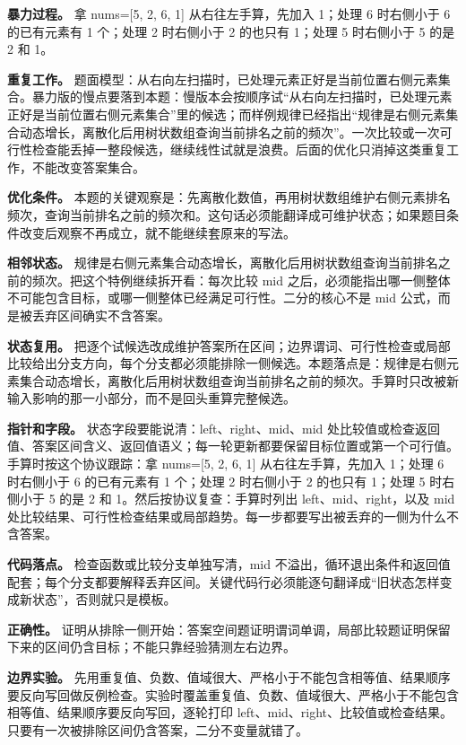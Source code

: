 \textbf{暴力过程。} 拿 nums=[5, 2, 6, 1] 从右往左手算，先加入 1；处理 6 时右侧小于 6 的已有元素有 1 个；处理 2 时右侧小于 2 的也只有 1；处理 5 时右侧小于 5 的是 2 和 1。

\textbf{重复工作。} 题面模型：从右向左扫描时，已处理元素正好是当前位置右侧元素集合。暴力版的慢点要落到本题：慢版本会按顺序试“从右向左扫描时，已处理元素正好是当前位置右侧元素集合”里的候选；而样例规律已经指出“规律是右侧元素集合动态增长，离散化后用树状数组查询当前排名之前的频次”。一次比较或一次可行性检查能丢掉一整段候选，继续线性试就是浪费。后面的优化只消掉这类重复工作，不能改变答案集合。

\textbf{优化条件。} 本题的关键观察是：先离散化数值，再用树状数组维护右侧元素排名频次，查询当前排名之前的频次和。这句话必须能翻译成可维护状态；如果题目条件改变后观察不再成立，就不能继续套原来的写法。

\textbf{相邻状态。} 规律是右侧元素集合动态增长，离散化后用树状数组查询当前排名之前的频次。把这个特例继续拆开看：每次比较 mid 之后，必须能指出哪一侧整体不可能包含目标，或哪一侧整体已经满足可行性。二分的核心不是 mid 公式，而是被丢弃区间确实不含答案。

\textbf{状态复用。} 把逐个试候选改成维护答案所在区间；边界谓词、可行性检查或局部比较给出分支方向，每个分支都必须能排除一侧候选。本题落点是：规律是右侧元素集合动态增长，离散化后用树状数组查询当前排名之前的频次。手算时只改被新输入影响的那一小部分，而不是回头重算完整候选。

\textbf{指针和字段。} 状态字段要能说清：left、right、mid、mid 处比较值或检查返回值、答案区间含义、返回值语义；每一轮更新都要保留目标位置或第一个可行值。手算时按这个协议跟踪：拿 nums=[5, 2, 6, 1] 从右往左手算，先加入 1；处理 6 时右侧小于 6 的已有元素有 1 个；处理 2 时右侧小于 2 的也只有 1；处理 5 时右侧小于 5 的是 2 和 1。然后按协议复查：手算时列出 left、mid、right，以及 mid 处比较结果、可行性检查结果或局部趋势。每一步都要写出被丢弃的一侧为什么不含答案。

\textbf{代码落点。} 检查函数或比较分支单独写清，mid 不溢出，循环退出条件和返回值配套；每个分支都要解释丢弃区间。关键代码行必须能逐句翻译成“旧状态怎样变成新状态”，否则就只是模板。

\textbf{正确性。} 证明从排除一侧开始：答案空间题证明谓词单调，局部比较题证明保留下来的区间仍含目标；不能只靠经验猜测左右边界。

\textbf{边界实验。} 先用重复值、负数、值域很大、严格小于不能包含相等值、结果顺序要反向写回做反例检查。实验时覆盖重复值、负数、值域很大、严格小于不能包含相等值、结果顺序要反向写回，逐轮打印 left、mid、right、比较值或检查结果。只要有一次被排除区间仍含答案，二分不变量就错了。

